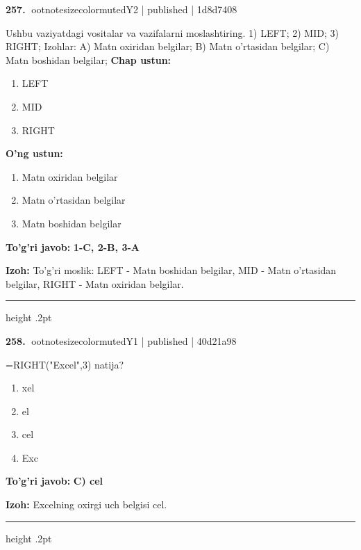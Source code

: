 \documentclass[10pt,a4paper]{article}
\begin{document}
\textbf{\color{ink}257.} {ootnotesizecolor{muted}Y2 | published | 1d8d7408}
\par
Ushbu vaziyatdagi vositalar va vazifalarni moslashtiring.  1) LEFT;  2) MID;  3) RIGHT;  Izohlar: A) Matn oxiridan belgilar;  B) Matn o'rtasidan belgilar;  C) Matn boshidan belgilar;
\textbf{Chap ustun:}\begin{enumerate}[label=\arabic*),leftmargin=9mm]
\item LEFT
\item MID
\item RIGHT
\end{enumerate}
\textbf{O'ng ustun:}\begin{enumerate}[label=\Alph*),leftmargin=9mm]
\item Matn oxiridan belgilar
\item Matn o'rtasidan belgilar
\item Matn boshidan belgilar
\end{enumerate}
\begin{tcolorbox}[enhanced,breakable,colback=teal!4,colframe=teal!55!black,boxrule=0.45pt,arc=1.2mm,left=2.8mm,right=2.8mm,top=2mm,bottom=2mm]
\textbf{\color{teal}To'g'ri javob:} \textbf{1-C, 2-B, 3-A}
\par\smallskip
\textbf{Izoh:} To'g'ri moslik: LEFT - Matn boshidan belgilar, MID - Matn o'rtasidan belgilar, RIGHT - Matn oxiridan belgilar.
\end{tcolorbox}
\vspace{2mm}\hrule height .2pt\vspace{2mm}

\textbf{\color{ink}258.} {ootnotesizecolor{muted}Y1 | published | 40d21a98}
\par
=RIGHT("Excel",3) natija?
\begin{enumerate}[label=\Alph*),leftmargin=9mm]
\item xel
\item el
\item cel
\item Exc
\end{enumerate}
\begin{tcolorbox}[enhanced,breakable,colback=teal!4,colframe=teal!55!black,boxrule=0.45pt,arc=1.2mm,left=2.8mm,right=2.8mm,top=2mm,bottom=2mm]
\textbf{\color{teal}To'g'ri javob:} \textbf{C) cel}
\par\smallskip
\textbf{Izoh:} Excelning oxirgi uch belgisi cel.
\end{tcolorbox}
\vspace{2mm}\hrule height .2pt\vspace{2mm}
\end{document}
